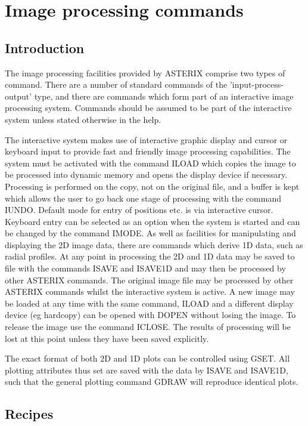 \documentclass{book}
\renewcommand{\_}{{\tt\char'137}}     %
\begin{document}
\chapter{Image processing commands}
\section{Introduction}
The image processing facilities provided by ASTERIX comprise
two types of command. There are a number of standard commands
of the 'input-process-output' type, and there are commands
which form part of an interactive image processing system.
Commands should be assumed to be part of the interactive system
unless stated otherwise in the help.
 
The interactive system makes use of interactive graphic display
and cursor or keyboard input to provide fast and friendly image
processing capabilities. The system must be activated with the
command ILOAD which copies the image to be processed into dynamic
memory and opens the display device if necessary. Processing is
performed on the copy, not on the original file, and a buffer is
kept which allows the user to go back one stage of processing with
the command IUNDO. Default mode for entry of positions etc.
is via interactive cursor. Keyboard entry can be selected as
an option when the system is started and can be changed by the
command IMODE. As well as facilities for manipulating
and displaying the 2D image data, there are commands which
derive 1D data, such as radial profiles. At any point in
processing the 2D and 1D data may be saved to file with the
commands ISAVE and ISAVE1D and may then be processed by other
ASTERIX commands. The original image file may be processed
by other ASTERIX commands whilst the interactive system is
active. A new image may be loaded at any time with the same
command, ILOAD and a different display device (eg hardcopy)
can be opened with DOPEN without losing the image. To release
the image use the command ICLOSE. The results of processing will
be lost at this point unless they have been saved explicitly.
 
The exact format of both 2D and 1D plots can be controlled
using GSET. All plotting attributes thus set are saved with
the data by ISAVE and ISAVE1D, such that the general plotting
command GDRAW will reproduce identical plots.
 
\section{Recipes}
 
\end{document}
